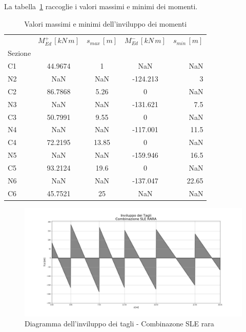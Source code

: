 La tabella~\ref{tab:max_min_bendingMomentEnvelope_sleRara} raccoglie i valori massimi e minimi dei momenti.

\begin{table}
  	\centering
  	\caption{Valori massimi e minimi dell'inviluppo dei momenti}
  	\label{tab:max_min_bendingMomentEnvelope_sleRara}
  	\begin{tabular}{lcccr}
		\toprule
		& $M_{Ed}^+\,[kN\,m]$ & $s_{max}\,[m]$ & $M_{Ed}^-\,[kN\,m]$ & $s_{min}\,[m]$ \\
		Sezione &             &          &             &          \\
		\midrule
		C1      &     44.9674 &        1 &         NaN &      NaN \\
N2      &         NaN &      NaN &    -124.213 &        3 \\
C2      &     86.7868 &     5.26 &           0 &      NaN \\
N3      &         NaN &      NaN &    -131.621 &      7.5 \\
C3      &     50.7991 &     9.55 &           0 &      NaN \\
N4      &         NaN &      NaN &    -117.001 &     11.5 \\
C4      &     72.2195 &    13.85 &           0 &      NaN \\
N5      &         NaN &      NaN &    -159.946 &     16.5 \\
C5      &     93.2124 &     19.6 &           0 &      NaN \\
N6      &         NaN &      NaN &    -137.047 &    22.65 \\
C6      &     45.7521 &       25 &         NaN &      NaN \\
\bottomrule
	\end{tabular}
  \end{table}
  
\begin{figure}
	\centering
	\includegraphics[width=\textwidth]{../../export/img/shearEnvelope_sleRara}
	\caption{Diagramma dell'inviluppo dei tagli - Combinazone SLE rara}
\end{figure}

